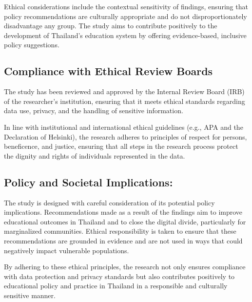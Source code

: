 \documentclass[
]{article}
\begin{document}
Ethical considerations include the contextual sensitivity of findings,
ensuring that policy recommendations are culturally appropriate and do
not disproportionately disadvantage any group. The study aims to
contribute positively to the development of Thailand's education system
by offering evidence-based, inclusive policy suggestions.

\hypertarget{compliance-with-ethical-review-boards}{%
\subsection{Compliance with Ethical Review
Boards}\label{compliance-with-ethical-review-boards}}

The study has been reviewed and approved by the Internal Review Board
(IRB) of the researcher's institution, ensuring that it meets ethical
standards regarding data use, privacy, and the handling of sensitive
information.

In line with institutional and international ethical guidelines (e.g.,
APA and the Declaration of Helsinki), the research adheres to principles
of respect for persons, beneficence, and justice, ensuring that all
steps in the research process protect the dignity and rights of
individuals represented in the data.

\hypertarget{policy-and-societal-implications}{%
\subsection{Policy and Societal
Implications:}\label{policy-and-societal-implications}}

The study is designed with careful consideration of its potential policy
implications. Recommendations made as a result of the findings aim to
improve educational outcomes in Thailand and to close the digital
divide, particularly for marginalized communities. Ethical
responsibility is taken to ensure that these recommendations are
grounded in evidence and are not used in ways that could negatively
impact vulnerable populations.

By adhering to these ethical principles, the research not only ensures
compliance with data protection and privacy standards but also
contributes positively to educational policy and practice in Thailand in
a responsible and culturally sensitive manner.
\end{document}
